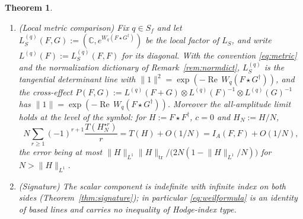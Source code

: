 \documentclass[11pt]{amsart}
\newtheorem{theorem}{Theorem}[section]
\theoremstyle{definition}
\theoremstyle{remark}
\newcommand{\C}{\mathbb C}
\newcommand{\Rel}{\operatorname{Re}}
\begin{document}
\begin{theorem}
\begin{enumerate}
\item[(f)] \emph{(Local metric comparison)}  Fix $q\in S_f$ and let
$L_S^{(q)}(F,G):=(\C,e^{W_q(F\star G^{\dagger})})$ be the local factor of
$L_S$, and write $L^{(q)}(F):=L_S^{(q)}(F,F)$ for its diagonal.  With the
convention \eqref{eq:metric} and the normalization dictionary of
Remark~\ref{rem:normdict}, $L_S^{(q)}$ is the tangential determinant line with
$\lVert1\rVert^{2}=\exp(-\Rel\,W_q(F\star G^{\dagger}))$, and the cross-effect
$P(F,G):=L^{(q)}(F+G)\otimes L^{(q)}(F)^{-1}\otimes L^{(q)}(G)^{-1}$ has
$\lVert1\rVert=\exp(-\Rel\,W_q(F\star G^{\dagger}))$.
Moreover the all-amplitude limit holds at the level of the symbol: for
$H:=F\star F^{\dagger}$, $c=0$ and $H_N:=H/N$,
\begin{equation}\label{eq:allamp}
N\sum_{r\ge1}(-1)^{r+1}\frac{T(H_N^{\star r})}{r}=T(H)+O(1/N)
=I_A(F,F)+O(1/N),
\end{equation}
the error being at most $\lVert H\rVert_{L^{1}}\lVert
H\rVert_{\mathrm{tr}}\bigl/\bigl(2N(1-\lVert H\rVert_{L^{1}}/N)\bigr)$ for
$N>\lVert H\rVert_{L^{1}}$.
\item[(g)] \emph{(Signature)}  The scalar component is indefinite with
infinite index on both sides (Theorem~\ref{thm:signature}); in particular
\eqref{eq:weilformula} is an identity of based lines and carries no
inequality of Hodge-index type.
\end{enumerate}
\end{theorem}
\end{document}
